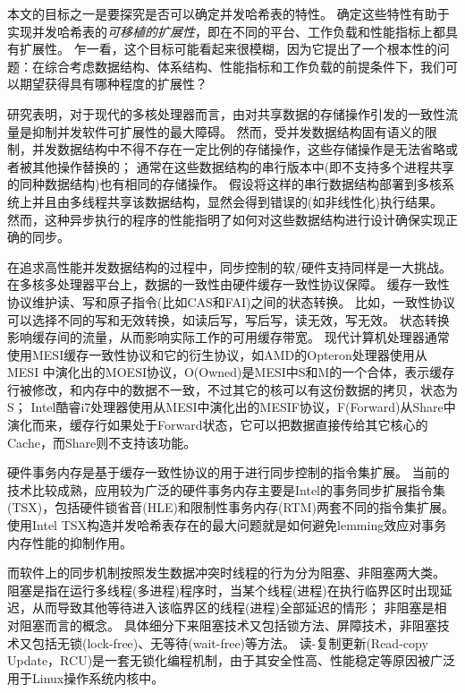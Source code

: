 本文的目标之一是要探究是否可以确定并发哈希表的特性。
确定这些特性有助于实现并发哈希表的\textit{可移植的扩展性}，即在不同的平台、工作负载和性能指标上都具有扩展性。
乍一看，这个目标可能看起来很模糊，因为它提出了一个根本性的问题：在综合考虑数据结构、体系结构、性能指标和工作负载的前提条件下，我们可以期望获得具有哪种程度的扩展性？

研究表明，对于现代的多核处理器而言，由对共享数据的存储操作引发的一致性流量是抑制并发软件可扩展性的最大障碍。
然而，受并发数据结构固有语义的限制，并发数据结构中不得不存在一定比例的存储操作，这些存储操作是无法省略或者被其他操作替换的；
通常在这些数据结构的串行版本中(即不支持多个进程共享的同种数据结构)也有相同的存储操作。
假设将这样的串行数据结构部署到多核系统上并且由多线程共享该数据结构，显然会得到错误的(如非线性化\cite{herlihy1990linearizability})执行结果。
然而，这种异步执行的程序的性能指明了如何对这些数据结构进行设计确保实现正确的同步。

在追求高性能并发数据结构的过程中，同步控制的软/硬件支持同样是一大挑战。
在多核多处理器平台上，数据的一致性由硬件缓存一致性协议保障。
缓存一致性协议维护读、写和原子指令(比如CAS和FAI)之间的状态转换。
比如，一致性协议可以选择不同的写和无效转换，如读后写，写后写，读无效，写无效。
状态转换影响缓存间的流量，从而影响实际工作的可用缓存带宽。
现代计算机处理器通常使用MESI缓存一致性协议和它的衍生协议，如AMD的Opteron处理器使用从MESI 中演化出的MOESI协议，O(Owned)是MESI中S和M的一个合体，表示缓存行被修改，和内存中的数据不一致，不过其它的核可以有这份数据的拷贝，状态为S；
Intel酷睿i7处理器使用从MESI中演化出的MESIF协议，F(Forward)从Share中演化而来，缓存行如果处于Forward状态，它可以把数据直接传给其它核心的Cache，而Share则不支持该功能。

硬件事务内存是基于缓存一致性协议的用于进行同步控制的指令集扩展。
当前的技术比较成熟，应用较为广泛的硬件事务内存主要是Intel的事务同步扩展指令集(TSX)\cite{tsx}，包括硬件锁省音(HLE)和限制性事务内存(RTM)两套不同的指令集扩展。
使用Intel TSX构造并发哈希表存在的最大问题就是如何避免lemming效应对事务内存性能的抑制作用。

而软件上的同步机制按照发生数据冲突时线程的行为分为阻塞、非阻塞两大类。
阻塞是指在运行多线程(多进程)程序时，当某个线程(进程)在执行临界区时出现延迟，从而导致其他等待进入该临界区的线程(进程)全部延迟的情形；
非阻塞是相对阻塞而言的概念。
具体细分下来阻塞技术又包括锁方法、屏障技术，非阻塞技术又包括无锁(lock-free)、无等待(wait-free)等方法。
读-复制更新(Read-copy Update，RCU)是一套无锁化编程机制，由于其安全性高、性能稳定等原因被广泛用于Linux操作系统内核中\cite{mckenney2003kernel,mckenney2004scaling,mckenney2013rcu}。

